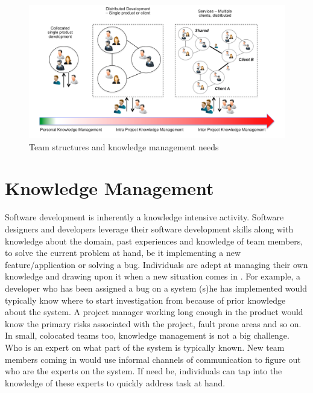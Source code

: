 
\begin{figure}
	\center
	\includegraphics[scale=0.45]{figs/km-types.png}
	\caption{Team structures and knowledge management needs}
	\label{fig-km}
\end{figure}

\section{Knowledge Management}
\label{sec:km}

Software development is inherently a knowledge intensive activity. Software designers and developers leverage their software development skills along with knowledge about the domain, past experiences and knowledge of team members, to solve the current problem at hand, be it implementing a new feature/application or solving a bug. Individuals are adept at managing their own knowledge and drawing upon it when a new situation comes in \cite{Bruce:2005}. For example, a developer who has been assigned a bug on a system (s)he has implemented would typically know where to start investigation from because of prior knowledge about the system. A project manager working long enough in the product would know the primary risks associated with the project, fault prone areas and so on. In small, colocated teams too, knowledge management is not a big challenge. Who is an expert on what part of the system is typically known. New team members coming in would use informal channels of communication to figure out who are the experts on the system. If need be, individuals can tap into the knowledge of these experts to quickly address task at hand. 


